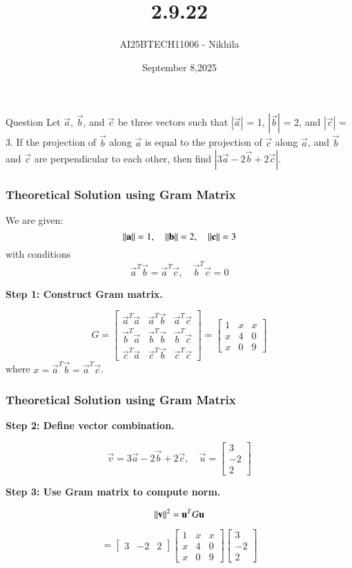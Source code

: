 \documentclass{beamer}
\title
{2.9.22}
\date{September 8,2025}
\author 
{AI25BTECH11006 - Nikhila}
\begin{document}
\frame{\titlepage}
\begin{frame}{Question}
 Let $\overrightarrow{a}$,
$\overrightarrow{b}$, and $\overrightarrow{c}$ be three vectors such that $|\overrightarrow{a}|$ = 1, $|\overrightarrow{b}|$ = 2, and $|\overrightarrow{c}|$ = 3. If the
projection of $\overrightarrow{b}$ along $\overrightarrow{a}$ is equal to the projection of $\overrightarrow{c}$ along $\overrightarrow{a}$, and $\overrightarrow{b}$ and $\overrightarrow{c}$ are perpendicular to each other, then find $|3\overrightarrow{a} - 2\overrightarrow{b} + 2\overrightarrow{c}|$.
\end{frame}


\begin{frame}[fragile]
    \frametitle{Theoretical Solution using Gram Matrix}
We are given:
\[
\left\lVert\mathbf{a}\right\rVert = 1, \quad \left\lVert\mathbf{b}\right\rVert = 2, \quad \left\lVert\mathbf{c}\right\rVert = 3
\]
with conditions
\[
\vec{a}^T\vec{b} = \vec{a}^T\vec{c}, \quad \vec{b}^T\vec{c} = 0
\]

\textbf{Step 1: Construct Gram matrix.}

\[
G =
\begin{bmatrix}
\vec{a}^T\vec{a} & \vec{a}^T\vec{b} & \vec{a}^T\vec{c} \\
\vec{b}^T\vec{a} & \vec{b}^T\vec{b} & \vec{b}^T\vec{c} \\
\vec{c}^T\vec{a} & \vec{c}^T\vec{b} & \vec{c}^T\vec{c}
\end{bmatrix}
=
\begin{bmatrix}
1 & x & x \\
x & 4 & 0 \\
x & 0 & 9
\end{bmatrix}
\]
where $x = \vec{a}^T\vec{b} = \vec{a}^T\vec{c}$.
\end{frame}


\begin{frame}[fragile]
\frametitle{Theoretical Solution using Gram Matrix}
\textbf{Step 2: Define vector combination.}

\[
\vec{v} = 3\vec{a} - 2\vec{b} + 2\vec{c}, \quad
\vec{u} =
\begin{bmatrix}
3 \\ -2 \\ 2
\end{bmatrix}
\]

\textbf{Step 3: Use Gram matrix to compute norm.}

\[
\left\lVert\mathbf{v}\right\rVert^2 = \mathbf{u}^T G \mathbf{u}
\]

\[
= 
\begin{bmatrix}
3 & -2 & 2
\end{bmatrix}
\begin{bmatrix}
1 & x & x \\
x & 4 & 0 \\
x & 0 & 9
\end{bmatrix}
\begin{bmatrix}
3 \\ -2 \\ 2
\end{bmatrix}
\]

\end{frame}
\end{document}

